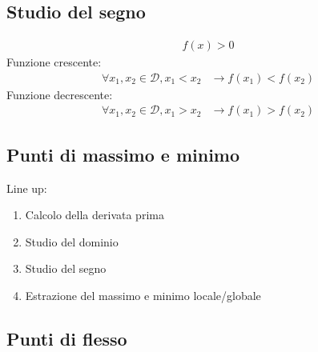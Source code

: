 \documentclass[a4paper]{article}
\begin{document}
		\subsection{Studio del segno}
		\begin{align*}
			f(x) > 0
		\end{align*}
		Funzione crescente:
		\begin{align*}
			\forall x_1,x_2 \in \mathcal{D}, x_1 < x_2 &\to f(x_1)<f(x_2)
		\end{align*}
		Funzione decrescente:
		\begin{align*}
			\forall x_1,x_2 \in \mathcal{D}, x_1 > x_2 &\to f(x_1)>f(x_2)
		\end{align*}

		\subsection{Punti di massimo e minimo}
		Line up:
		\begin{enumerate}
			\item Calcolo della derivata prima
			\item Studio del dominio
			\item Studio del segno
			\item Estrazione del massimo e minimo locale/globale
		\end{enumerate}
		
		
		\subsection{Punti di flesso}
	
	
	
	
	
	
	
	
	
	
	
	
	
	
	
	
	
	
	
	
	
	
	
	
	
	
	
	
	
	
	
	
	
	
	
	
	
	
	
	
	
	
	
	
	
	
	
	
	
	
	
	
	
	
	
\end{document}
